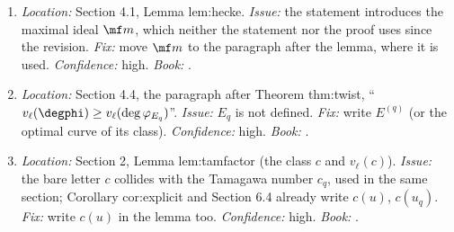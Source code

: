 \begin{sloppypar}
\begin{enumerate}[resume*=errata]
observation that $\pi(t)=t+(\pi(t)-t)$ is a nonzero scalar in $I+\wp$; and the converse inclusion $L[\wp]^\perp\subseteq L[I]$ shows only $ty=0$ for one $t$, which suffices because $I=\mc Ot$ ($\pi|_I$ is
injective with image $\eta$). \emph{Fix:} add the two sentences (steps (2) and (3) of the proof of ). \emph{Confidence:} high. \emph{Book:} .
\item\label{err:paper:hecke-m} \emph{Location:} Section 4.1, Lemma lem:hecke. \emph{Issue:} the statement introduces the maximal ideal $\mf m$, which neither the statement nor the proof uses since the
revision. \emph{Fix:} move $\mf m$ to the paragraph after the lemma, where it is used. \emph{Confidence:} high. \emph{Book:} .
\item\label{err:paper:Eq} \emph{Location:} Section 4.4, the paragraph after Theorem thm:twist, ``$v_\ell(\degphi)\ge v_\ell(\deg\varphi_{E_q})$''. \emph{Issue:} $E_q$ is not defined. \emph{Fix:} write $E^{(q)}$ (or the optimal curve of
its class). \emph{Confidence:} high. \emph{Book:} .
\item\label{err:paper:c-letter} \emph{Location:} Section 2, Lemma lem:tamfactor (the class $c$ and $v_\ell(c)$). \emph{Issue:} the bare letter $c$ collides with the Tamagawa number $c_q$, used in the same section;
Corollary cor:explicit and Section 6.4 already write $c(u)$, $c(u_q)$. \emph{Fix:} write $c(u)$ in the lemma too. \emph{Confidence:} high. \emph{Book:} .
\end{enumerate}


\end{sloppypar}
